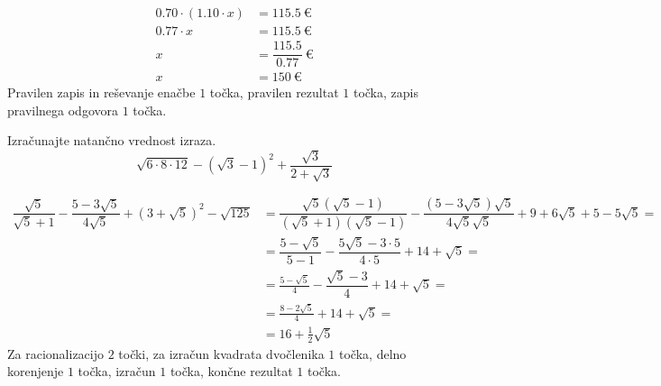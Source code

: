 \documentclass[addpoints]{exam}
\begin{document}
\begin{questions}

        \begin{solution}[2cm]
            \begin{align*}
                0.70\cdot \left(1.10\cdot x\right) &=115.5~\euro \\
                                     0.77 \cdot x &= 115.5~\euro \\
                                                x &= \dfrac{115.5}{0.77}~\euro \\
                                                x &= 150~\euro
            \end{align*}
            Pravilen zapis in reševanje enačbe $1$ točka, pravilen rezultat $1$ točka, zapis pravilnega odgovora $1$ točka.
        \end{solution}

        



    \question[4]
    Izračunajte natančno vrednost izraza.
    $$ \sqrt{6\cdot 8\cdot 12}-\left(\sqrt{3}-1\right)^2+\dfrac{\sqrt{3}}{2+\sqrt{3}} $$

    \begin{solution}[9cm]
        \begin{align*} 
            \dfrac{\sqrt{5}}{\sqrt{5}+1}-\dfrac{5-3\sqrt{5}}{4\sqrt{5}}+\left(3+\sqrt{5}\right)^2-\sqrt{125}&=\dfrac{\sqrt{5}(\sqrt{5}-1)}{(\sqrt{5}+1)(\sqrt{5}-1)}-\dfrac{(5-3\sqrt{5})\sqrt{5}}{4\sqrt{5}\sqrt{5}}+9+6\sqrt{5}+5-5\sqrt{5}= \\
                                                                                                            &=\dfrac{5-\sqrt{5}}{5-1}-\dfrac{5\sqrt{5}-3\cdot 5}{4\cdot 5}+14+\sqrt{5}= \\
                                                                                                            &=\frac{5-\sqrt{5}}{4}-\dfrac{\sqrt{5}-3}{4}+14+\sqrt{5}= \\
                                                                                                            &=\frac{8-2\sqrt{5}}{4}+14+\sqrt{5}= \\
                                                                                                            &=16+\frac{1}{2}\sqrt{5}
        \end{align*}
        Za racionalizacijo $2$ točki, za izračun kvadrata dvočlenika $1$ točka, delno korenjenje $1$ točka, izračun $1$ točka, končne rezultat $1$ točka.
    \end{solution}
    

\end{questions}
\end{document}
